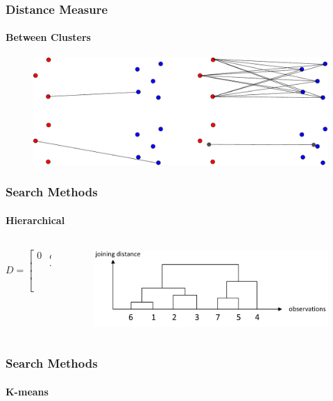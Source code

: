 \documentclass[aspectratio=169,10pt,t]{beamer}
\begin{document}
\begin{frame}[t]
	\frametitle{Distance Measure}
	\framesubtitle{Between Clusters}

	\begin{figure}[h]
		\centering
		\includegraphics[width=\textwidth]{images/linkage.pdf}
	\end{figure}
\end{frame}


\begin{frame}[t]
	\frametitle{Search Methods}
	\framesubtitle{Hierarchical}

	\begin{columns}
		\begin{column}{0.5\textwidth}
			\[
				D = \begin{bmatrix}
					0 & d_{12} & \cdots & d_{1n}\\
						& \ddots & & \\
						&& \ddots& \\
						&&&0
				\end{bmatrix}
			\] 
		\end{column}
		\begin{column}{0.5\textwidth}

			\begin{figure}[h]
				\centering
				\includegraphics[width=1\textwidth]{images/hirakisk-2.png}
			\end{figure}
		\end{column}
	\end{columns}
\end{frame}

\begin{frame}[t]
	\frametitle{Search Methods}
	\framesubtitle{K-means}

	\begin{figure}[h]
		\centering
	\end{figure}

\end{frame}
\end{document}
